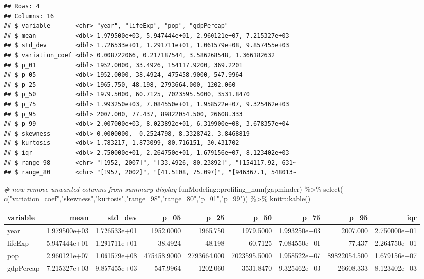 \documentclass[
]{book}
\newenvironment{Shaded}{\begin{snugshade}}{\end{snugshade}}
\newcommand{\CommentTok}[1]{\textcolor[rgb]{0.56,0.35,0.01}{\textit{#1}}}
\newcommand{\FunctionTok}[1]{\textcolor[rgb]{0.00,0.00,0.00}{#1}}
\newcommand{\NormalTok}[1]{#1}
\newcommand{\SpecialCharTok}[1]{\textcolor[rgb]{0.00,0.00,0.00}{#1}}
\newcommand{\StringTok}[1]{\textcolor[rgb]{0.31,0.60,0.02}{#1}}
\begin{document}
\begin{verbatim}
## Rows: 4
## Columns: 16
## $ variable       <chr> "year", "lifeExp", "pop", "gdpPercap"
## $ mean           <dbl> 1.979500e+03, 5.947444e+01, 2.960121e+07, 7.215327e+03
## $ std_dev        <dbl> 1.726533e+01, 1.291711e+01, 1.061579e+08, 9.857455e+03
## $ variation_coef <dbl> 0.008722066, 0.217187544, 3.586268548, 1.366182632
## $ p_01           <dbl> 1952.0000, 33.4926, 154117.9200, 369.2201
## $ p_05           <dbl> 1952.0000, 38.4924, 475458.9000, 547.9964
## $ p_25           <dbl> 1965.750, 48.198, 2793664.000, 1202.060
## $ p_50           <dbl> 1979.5000, 60.7125, 7023595.5000, 3531.8470
## $ p_75           <dbl> 1.993250e+03, 7.084550e+01, 1.958522e+07, 9.325462e+03
## $ p_95           <dbl> 2007.000, 77.437, 89822054.500, 26608.333
## $ p_99           <dbl> 2.007000e+03, 8.023892e+01, 6.319900e+08, 3.678357e+04
## $ skewness       <dbl> 0.0000000, -0.2524798, 8.3328742, 3.8468819
## $ kurtosis       <dbl> 1.783217, 1.873099, 80.716151, 30.431702
## $ iqr            <dbl> 2.750000e+01, 2.264750e+01, 1.679156e+07, 8.123402e+03
## $ range_98       <chr> "[1952, 2007]", "[33.4926, 80.23892]", "[154117.92, 631~
## $ range_80       <chr> "[1957, 2002]", "[41.5108, 75.097]", "[946367.1, 548013~
\end{verbatim}

\begin{Shaded}
\begin{Highlighting}[]
\CommentTok{\# now remove unwanted columns from summary display}
\NormalTok{funModeling}\SpecialCharTok{::}\FunctionTok{profiling\_num}\NormalTok{(gapminder) }\SpecialCharTok{\%\textgreater{}\%}
  \FunctionTok{select}\NormalTok{(}\SpecialCharTok{{-}}\FunctionTok{c}\NormalTok{(}\StringTok{"variation\_coef"}\NormalTok{,}\StringTok{"skewness"}\NormalTok{,}\StringTok{"kurtosis"}\NormalTok{,}\StringTok{"range\_98"}\NormalTok{,}\StringTok{"range\_80"}\NormalTok{,}\StringTok{"p\_01"}\NormalTok{,}\StringTok{"p\_99"}\NormalTok{)) }\SpecialCharTok{\%\textgreater{}\%}
\NormalTok{  knitr}\SpecialCharTok{::}\FunctionTok{kable}\NormalTok{()}
\end{Highlighting}
\end{Shaded}

\begin{tabular}{l|r|r|r|r|r|r|r|r}
\hline
variable & mean & std\_dev & p\_05 & p\_25 & p\_50 & p\_75 & p\_95 & iqr\\
\hline
year & 1.979500e+03 & 1.726533e+01 & 1952.0000 & 1965.750 & 1979.5000 & 1.993250e+03 & 2007.000 & 2.750000e+01\\
\hline
lifeExp & 5.947444e+01 & 1.291711e+01 & 38.4924 & 48.198 & 60.7125 & 7.084550e+01 & 77.437 & 2.264750e+01\\
\hline
pop & 2.960121e+07 & 1.061579e+08 & 475458.9000 & 2793664.000 & 7023595.5000 & 1.958522e+07 & 89822054.500 & 1.679156e+07\\
\hline
gdpPercap & 7.215327e+03 & 9.857455e+03 & 547.9964 & 1202.060 & 3531.8470 & 9.325462e+03 & 26608.333 & 8.123402e+03\\
\hline
\end{tabular}
\end{document}
